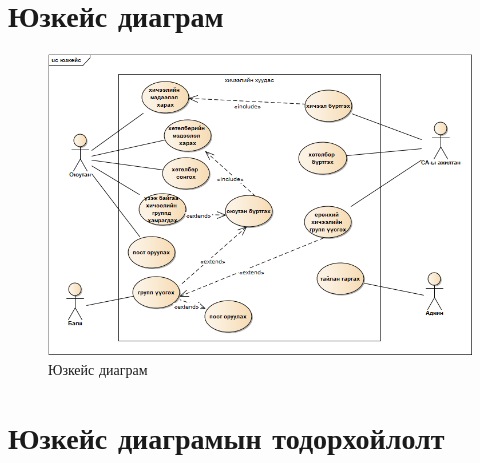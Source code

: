 \section{Юзкейс диаграм}
\begin{figure}[htbp]
	\centering
	\includegraphics[angle=90,scale=0.65]{Diagrams/usecase.png}
	\caption[Юзкейс диаграм]{Юзкейс диаграм}
	\label{fit:UseCase}
\end{figure}
\newpage
\section{Юзкейс диаграмын тодорхойлолт}

